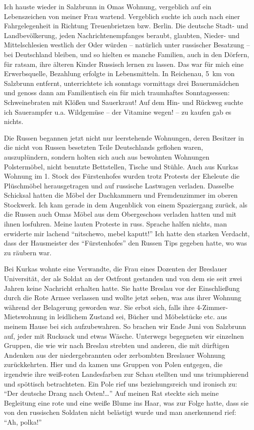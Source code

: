 \documentclass[a5paper,pagesize,10pt,twoside=true]{scrbook}
\renewcommand{\marginpar}[2][]{}
\begin{document}
Ich hauste wieder in Salzbrunn in Omas Wohnung, vergeblich auf ein Lebenszeichen von meiner Frau wartend. Vergeblich suchte ich auch nach einer Fahrgelegenheit in Richtung Treuenbrietzen bzw. Berlin. Die deutsche Stadt- und Landbevölkerung, jeden Nachrichtenempfanges beraubt, \marginpar{91} glaubten, Nieder- und Mittelschlesien westlich der Oder würden -- natürlich unter russischer Besatzung -- bei Deutschland bleiben, und so hielten es manche Familien, auch in den Dörfern, für ratsam, ihre älteren Kinder Russisch lernen zu lassen. Das war für mich eine Erwerbsquelle, Bezahlung erfolgte in Lebensmitteln. In Reichenau, 5~km von Salzbrunn entfernt, unterrichtete ich sonntags vormittags drei Bauernmädchen und genoss dann am Familientisch ein für mich traumhaftes Sonntagsessen: Schweinebraten mit Klößen und Sauerkraut! Auf dem Hin- und Rückweg suchte ich Sauerampfer u.a. Wildgemüse -- der Vitamine wegen! -- zu kaufen gab es nichts.

Die Russen begannen jetzt nicht nur leerstehende Wohnungen, deren Besitzer in die nicht von Russen besetzten Teile Deutschlands geflohen waren, auszuplündern, sondern holten sich auch aus bewohnten Wohnungen Polstermöbel, nicht benutzte Bettstellen, Tische und Stühle. Auch aus Kurkas Wohnung im 1. Stock des Fürstenhofes wurden trotz Protests der Eheleute die Plüschmöbel herausgetragen und auf russische Lastwagen verladen. Dasselbe Schicksal hatten die Möbel der Dachkammern und Fremdenzimmer im oberen Stockwerk. Ich kam gerade in dem Augenblick von einem Spaziergang \marginpar{92} zurück, als die Russen auch Omas Möbel aus dem Obergeschoss verladen hatten und mit ihnen losfuhren. Meine lauten Proteste in russ. Sprache halfen nichts, man erwiderte mir lachend \enquote{nitschewo, mebel kaputt!} Ich hatte den starken Verdacht, dass der Hausmeister des \enquote{Fürstenhofes} den Russen Tips gegeben hatte, wo was zu räubern war.

Bei Kurkas wohnte eine Verwandte, die Frau eines Dozenten der Breslauer Universität, der als Soldat an der Ostfront gestanden und von dem sie seit zwei Jahren keine Nachricht erhalten hatte. Sie hatte Breslau vor der Einschließung durch die Rote Armee verlassen und wollte jetzt sehen, was aus ihrer Wohnung während der Belagerung geworden war. Sie erbot sich, falls ihre 4-Zimmer-Mietswohnung in leidlichem Zustand sei, Bücher und Möbelstücke etc. aus meinem Hause bei sich aufzubewahren. So brachen wir Ende Juni von Salzbrunn auf, jeder mit Rucksack und etwas Wäsche. Unterwegs begegneten wir einzelnen Gruppen, die wie wir nach Breslau strebten und anderen, die mit dürftigen Andenken aus der niedergebrannten oder zerbombten Breslauer Wohnung zurückkehrten. Hier und da \marginpar{93} kamen uns Gruppen von Polen entgegen, die irgendwie ihre weiß-roten Landesfarben zur Schau stellten und uns triumphierend und spöttisch betrachteten. Ein Pole rief uns beziehungsreich und ironisch zu: \enquote{Der deutsche Drang nach Osten!\dots} Auf meinen Rat steckte sich meine Begleitung eine rote und eine weiße Blume ins Haar, was zur Folge hatte, dass sie von den russischen Soldaten nicht belästigt wurde und man anerkennend rief: \enquote{Ah, polka!}
\end{document}
